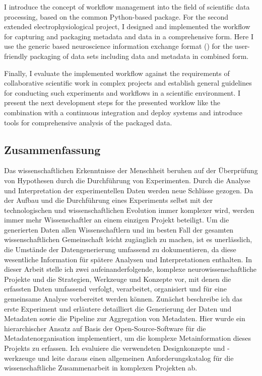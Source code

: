 I introduce the concept of workflow management into the field of scientific data processing, based on the common Python-based  package. For the second extended electrophysiological project, I designed and implemented the workflow for capturing and packaging metadata and data in a comprehensive form. Here I use the generic  based neuroscience information exchange format () for the user-friendly packaging of data sets including data and metadata in combined form.

Finally, I evaluate the implemented workflow against the requirements of collaborative scientific work in complex projects and establish general guidelines for conducting such experiments and workflows in a scientific environment. I present the next development steps for the presented worklow like the combination with a continuous integration and deploy systems and introduce tools for comprehensive analysis of the packaged data.


\clearpage
\thispagestyle{empty}
\subsection*{Zusammenfassung}
Das wissenschaftlichen Erkenntnisse der Menschheit beruhen auf der Überprüfung von Hypothesen durch die Durchführung von Experimenten. Durch die Analyse und Interpretation der experimentellen Daten werden neue Schlüsse gezogen. Da der Aufbau und die Durchführung eines Experiments selbst mit der technologischen und wissenschaftlichen Evolution immer komplexer wird, werden immer mehr Wissenschaftler an einem einzigen Projekt beteiligt. Um die generierten Daten allen Wissenschaftlern und im besten Fall der gesamten wissenschaftlichen Gemeinschaft leicht zugänglich zu machen, ist es unerlässlich, die Umstände der Datengenerierung umfassend zu dokumentieren, da diese wesentliche Information für spätere Analysen und Interpretationen enthalten.
In dieser Arbeit stelle ich zwei aufeinanderfolgende, komplexe neurowissenschaftliche Projekte und die Strategien, Werkzeuge und Konzepte vor, mit denen die erfassten Daten umfassend verfolgt, verarbeitet, organisiert und für eine gemeinsame Analyse vorbereitet werden können. Zunächst beschreibe ich das erste Experiment und erläutere detailliert die Generierung der Daten und Metadaten sowie die Pipeline zur Aggregation von Metadaten. Hier wurde ein hierarchischer Ansatz auf Basis der Open-Source-Software  für die Metadatenorganisation implementiert, um die komplexe Metainformation dieses Projekts zu erfassen. Ich evaluiere die verwendeten Designkonzepte und -werkzeuge und leite daraus einen allgemeinen Anforderungskatalog für die wissenschaftliche Zusammenarbeit in komplexen Projekten ab.

